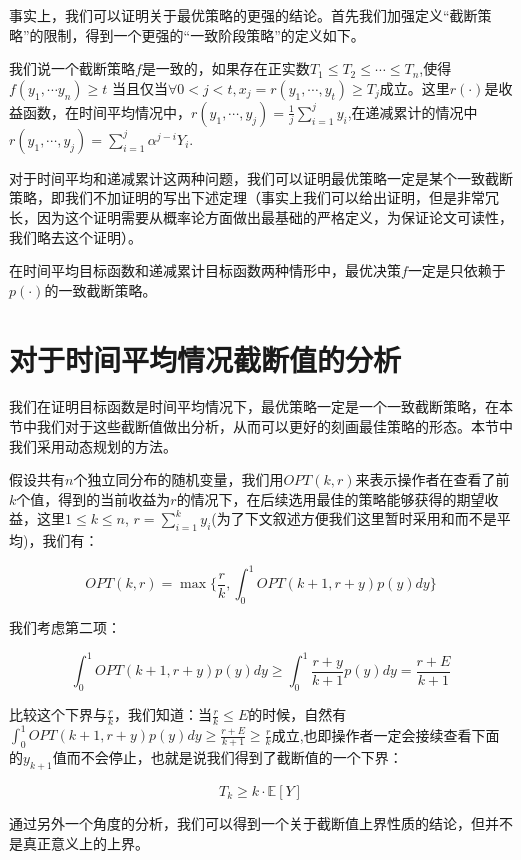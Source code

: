 \documentclass[bachelor]{thuthesis}
\begin{document}
事实上，我们可以证明关于最优策略的更强的结论。首先我们加强定义“截断策略”的限制，得到一个更强的“一致阶段策略”的定义如下。

我们说一个截断策略$f$是一致的，如果存在正实数$T_1\le T_2\le\cdots\le T_n$,使得$f(y_1,\cdots y_n)\ge t$ 当且仅当$\forall 0<j<t, x_j=r(y_1,\cdots,y_t)\ge T_j$成立。这里$r(\cdot)$是收益函数，在时间平均情况中，$r(y_1,\cdots,y_j)=\frac{1}{j}\sum_{i=1}^{j}y_i$,在递减累计的情况中 $r(y_1,\cdots,y_j)=\sum_{i=1}^{j} \alpha^{j-i}Y_i$.

对于时间平均和递减累计这两种问题，我们可以证明最优策略一定是某个一致截断策略，即我们不加证明的写出下述定理（事实上我们可以给出证明，但是非常冗长，因为这个证明需要从概率论方面做出最基础的严格定义，为保证论文可读性，我们略去这个证明）。

\begin{theorem}

在时间平均目标函数和递减累计目标函数两种情形中，最优决策$f$一定是只依赖于$p(\cdot)$的一致截断策略。

\end{theorem}


\section{对于时间平均情况截断值的分析}

我们在证明目标函数是时间平均情况下，最优策略一定是一个一致截断策略，在本节中我们对于这些截断值做出分析，从而可以更好的刻画最佳策略的形态。本节中我们采用动态规划的方法。

假设共有$n$个独立同分布的随机变量，我们用$OPT(k,r)$来表示操作者在查看了前$k$个值，得到的当前收益为$r$的情况下，在后续选用最佳的策略能够获得的期望收益，这里$1\le k\le n$, $r=\sum_{i=1}^{k}y_i$(为了下文叙述方便我们这里暂时采用和而不是平均)，我们有：

\[OPT(k,r)=\max\{\frac{r}{k},\int_{0}^{1}OPT(k+1,r+y)p(y)dy\}\]

我们考虑第二项：

\[\int_{0}^{1}OPT(k+1,r+y)p(y)dy\ge \int_{0}^{1}\frac{r+y}{k+1}p(y)dy=\frac{r+E}{k+1}\]

比较这个下界与$\frac{r}{k}$，我们知道：当$\frac{r}{k}\le E$的时候，自然有$\int_{0}^{1}OPT(k+1,r+y)p(y)dy\ge\frac{r+E}{k+1}\ge\frac{r}{k}$成立,也即操作者一定会接续查看下面的$y_{k+1}$值而不会停止，也就是说我们得到了截断值的一个下界：

\[T_k\ge k\cdot\mathbb{E}[Y]\]

通过另外一个角度的分析，我们可以得到一个关于截断值上界性质的结论，但并不是真正意义上的上界。
\end{document}
